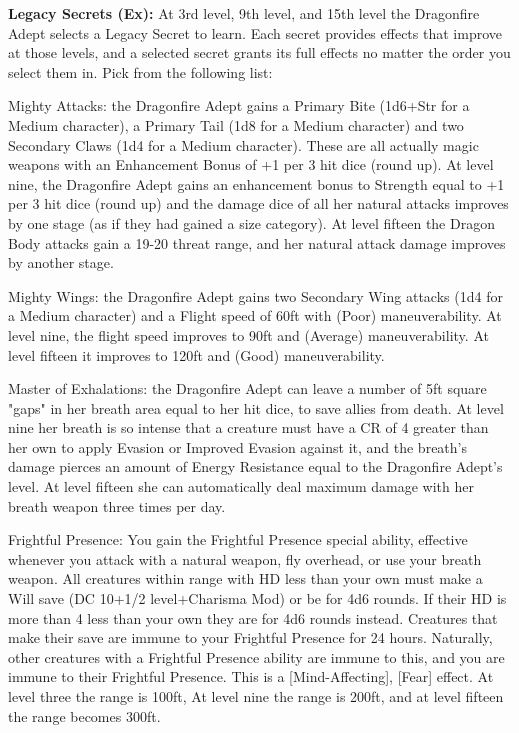 \textbf{Legacy Secrets (Ex):} At 3rd level, 9th level, and 15th level the Dragonfire Adept selects a Legacy Secret to learn. Each secret provides effects that improve at those levels, and a selected secret grants its full effects no matter the order you select them in. Pick from the following list:

\begin{description*}
\item[Mighty Attacks:] the Dragonfire Adept gains a Primary Bite (1d6+Str for a Medium character), a Primary Tail (1d8 for a Medium character) and two Secondary Claws (1d4 for a Medium character). These are all actually magic weapons with an Enhancement Bonus of +1 per 3 hit dice (round up). At level nine, the Dragonfire Adept gains an enhancement bonus to Strength equal to +1 per 3 hit dice (round up) and the damage dice of all her natural attacks improves by one stage (as if they had gained a size category). At level fifteen the Dragon Body attacks gain a 19-20 threat range, and her natural attack damage improves by another stage.
\item[Mighty Wings:] the Dragonfire Adept gains two Secondary Wing attacks (1d4 for a Medium character) and a Flight speed of 60ft with (Poor) maneuverability. At level nine, the flight speed improves to 90ft  and (Average) maneuverability. At level fifteen it improves to 120ft and (Good) maneuverability.
\item[Master of Exhalations:] the Dragonfire Adept can leave a number of 5ft square "gaps" in her breath area equal to her hit dice, to save allies from death. At level nine her breath is so intense that a creature must have a CR of 4 greater than her own to apply Evasion or Improved Evasion against it, and the breath's damage pierces an amount of Energy Resistance equal to the Dragonfire Adept's level. At level fifteen she can automatically deal maximum damage with her breath weapon three times per day.
\item[Frightful Presence:] You gain the Frightful Presence special ability, effective whenever you attack with a natural weapon, fly overhead, or use your breath weapon. All creatures within range with HD less than your own must make a Will save (DC 10+1/2 level+Charisma Mod) or be  for 4d6 rounds. If their HD is more than 4 less than your own they are  for 4d6 rounds instead. Creatures that make their save are immune to your Frightful Presence for 24 hours. Naturally, other creatures with a Frightful Presence ability are immune to this, and you are immune to their Frightful Presence. This is a [Mind-Affecting], [Fear] effect. At level three the range is 100ft, At level nine the range is 200ft, and at level fifteen the range becomes 300ft.

\end{description*}
